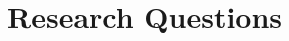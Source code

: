 \documentclass{isd}
\begin{document}




\section{Research Questions}
\label{sec:researchQuestions}
\end{document}
